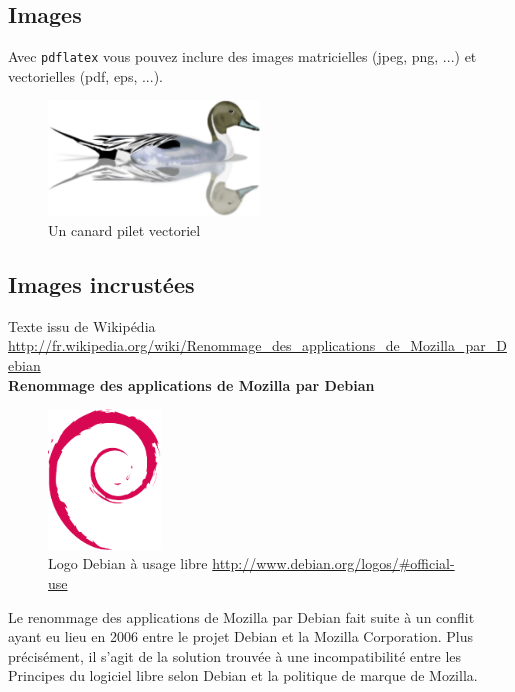 \documentclass[a4paper]{article}
\begin{document}
		\subsection{Images}

			Avec \texttt{pdflatex} vous pouvez inclure des images matricielles (jpeg, png, ...) et vectorielles (pdf, eps, ...). \\
			
			\begin{figure}[h]
			\centering \includegraphics[width=0.5\textwidth]{img/Canard_Pilet.pdf}
			\caption{Un canard pilet vectoriel}
			\end{figure}

		\subsection{Images incrustées}

			\noindent Texte issu de Wikipédia \url{http://fr.wikipedia.org/wiki/Renommage_des_applications_de_Mozilla_par_Debian} \\

			\noindent \textbf{Renommage des applications de Mozilla par Debian} \\

			\begin{figure}
				\centering
				\includegraphics[width=3cm]{img/debian.pdf}
				\caption{Logo Debian à usage libre \url{http://www.debian.org/logos/\#official-use}}
			\end{figure}

			Le renommage des applications de Mozilla par Debian fait suite à un conflit ayant eu lieu en 2006 entre le projet Debian et la Mozilla Corporation. Plus précisément, il s'agit de la solution trouvée à une incompatibilité entre les Principes du logiciel libre selon Debian et la politique de marque de Mozilla. \\
\end{document}
